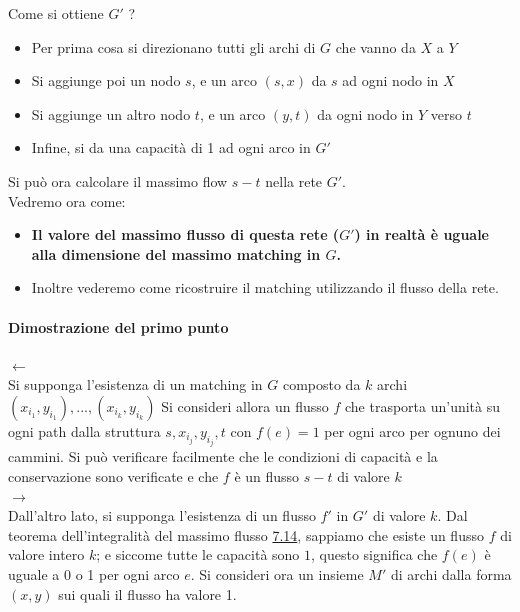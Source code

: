 Come si ottiene $G'$ ? 
\begin{itemize}
    \item Per prima cosa si direzionano tutti gli archi di $G$ che vanno da $X$ a $Y$
    \item Si aggiunge poi un nodo $s$, e un arco $(s, x)$ da $s$ ad ogni nodo in $X$
    \item Si aggiunge un altro nodo $t$, e un arco $(y, t)$ da ogni nodo in $Y$ verso $t$
    \item Infine, si da una capacità di 1 ad ogni arco in $G'$
\end{itemize}

Si può ora calcolare il massimo flow $s-t$ nella rete $G'$.\\

Vedremo ora come:
\begin{itemize}
    \item \textbf{Il valore del massimo flusso di questa rete ($G'$) in 
    realtà è uguale alla dimensione del massimo matching in $G$.}
    \item Inoltre vederemo come ricostruire il matching utilizzando il flusso della rete.
\end{itemize}

\paragraph{Dimostrazione del primo punto}

$\leftarrow$\\
Si supponga l'esistenza di un matching in $G$ composto da $k$
archi $(x_{i_1}, y_{i_1}), ..., (x_{i_k}, y_{i_k})$ Si consideri
allora un flusso $f$ che trasporta un'unità su ogni path dalla
struttura $s, x_{i_j}, y_{i_j}, t$ con $f(e) = 1$ per ogni arco per
ognuno dei cammini. Si può verificare facilmente che le condizioni di
capacità e la conservazione sono verificate e che $f$ è un flusso
$s-t$ di valore $k$\\

$\rightarrow$\\
Dall'altro lato, si supponga l'esistenza di un flusso $f'$ in
$G'$ di valore $k$. Dal teorema dell'integralità del massimo flusso
\protect\hyperlink{def-714}{7.14}, sappiamo che esiste un flusso $f$
di valore intero $k$; e siccome tutte le capacità sono $1$, questo
significa che $f(e)$ è uguale a 0 o 1 per ogni arco $e$. Si
consideri ora un insieme $M'$ di archi dalla forma $(x, y)$ sui
quali il flusso ha valore 1.\\

